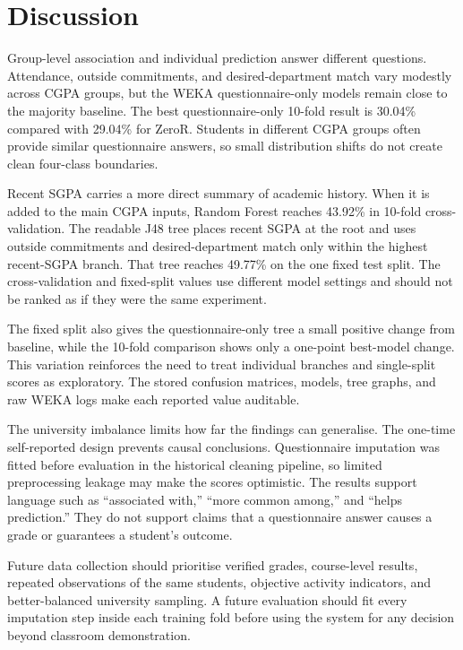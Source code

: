 \section{Discussion}
Group-level association and individual prediction answer different questions. Attendance, outside commitments, and desired-department match vary modestly across CGPA groups, but the WEKA questionnaire-only models remain close to the majority baseline. The best questionnaire-only 10-fold result is 30.04\% compared with 29.04\% for ZeroR. Students in different CGPA groups often provide similar questionnaire answers, so small distribution shifts do not create clean four-class boundaries.

Recent SGPA carries a more direct summary of academic history. When it is added to the main CGPA inputs, Random Forest reaches 43.92\% in 10-fold cross-validation. The readable J48 tree places recent SGPA at the root and uses outside commitments and desired-department match only within the highest recent-SGPA branch. That tree reaches 49.77\% on the one fixed test split. The cross-validation and fixed-split values use different model settings and should not be ranked as if they were the same experiment.

The fixed split also gives the questionnaire-only tree a small positive change from baseline, while the 10-fold comparison shows only a one-point best-model change. This variation reinforces the need to treat individual branches and single-split scores as exploratory. The stored confusion matrices, models, tree graphs, and raw WEKA logs make each reported value auditable.

The university imbalance limits how far the findings can generalise. The one-time self-reported design prevents causal conclusions. Questionnaire imputation was fitted before evaluation in the historical cleaning pipeline, so limited preprocessing leakage may make the scores optimistic. The results support language such as ``associated with,'' ``more common among,'' and ``helps prediction.'' They do not support claims that a questionnaire answer causes a grade or guarantees a student's outcome.

Future data collection should prioritise verified grades, course-level results, repeated observations of the same students, objective activity indicators, and better-balanced university sampling. A future evaluation should fit every imputation step inside each training fold before using the system for any decision beyond classroom demonstration.
